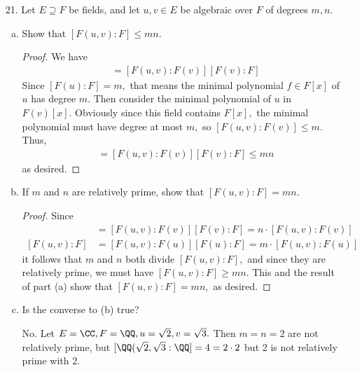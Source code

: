 \documentclass{article}
\begin{document}
\begin{itemize}
	\item[21.] Let $E\supseteq F$ be fields, and let $u, v\in E$ be algebraic over $F$ of degrees $m, n.$
		\begin{enumerate}[(a)]
			\item Show that $[F(u, v):F]\le mn.$
				\begin{proof}
					We have
					\begin{align*}
						[F(u, v):F] &= [F(u, v):F(v)][F(v):F]
					\end{align*}
					Since $[F(u):F]=m,$ that means the minimal polynomial $f\in F[x]$ of $u$ has degree $m.$ Then consider the minimal polynomial of $u$ in $F(v)[x].$ Obviously since this field contains $F[x],$ the minimal polynomial must have degree at most $m,$ so $[F(u, v):F(v)]\le m.$ Thus, 
					\begin{align*}
						[F(u, v):F] &= [F(u, v):F(v)][F(v):F] \le mn
					\end{align*}
					as desired.
				\end{proof}

			\item If $m$ and $n$ are relatively prime, show that $[F(u, v):F]=mn.$
				\begin{proof}
					Since
					\begin{align*}
						[F(u, v):F] &= [F(u, v):F(v)][F(v):F] = n\cdot [F(u, v):F(v)] \\
						[F(u, v):F] &= [F(u, v):F(u)][F(u):F] = m\cdot [F(u, v):F(u)]
					\end{align*}
					it follows that $m$ and $n$ both divide $[F(u, v):F],$ and since they are relatively prime, we must have $[F(u, v):F]\ge mn.$ This and the result of part (a) show that $[F(u, v):F]=mn,$ as desired.
				\end{proof}

			\item Is the converse to (b) true?
				\begin{soln}
					No. Let $E=\CC, F=\QQ, u=\sqrt{2}, v=\sqrt{3}.$ Then $m=n=2$ are not relatively prime, but $[\QQ(\sqrt{2}, \sqrt{3}:\QQ]=4=2\cdot 2$ but 2 is not relatively prime with 2.
				\end{soln}
				
		\end{enumerate}


\end{itemize}
\end{document}
